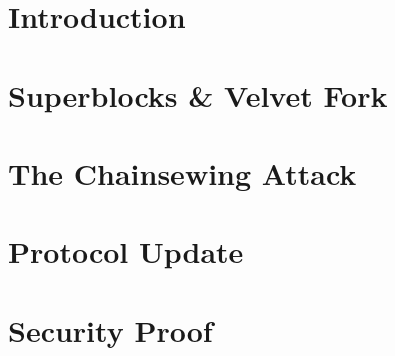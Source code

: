 \section{Introduction}
\cite{Backbone}\cite{nakamoto}\cite{NIPoPoWs}\cite{Zamyatin}\cite{selfish_mining}

\section{Superblocks \& Velvet Fork}


\section{The Chainsewing Attack}


\section{Protocol Update}


\section{Security Proof}




\begin{acks}
\end{acks}
